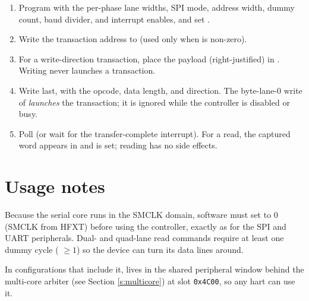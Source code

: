 \begin{enumerate}
	\item Program  with the per-phase lane widths, SPI mode, address width, dummy count, baud divider, and interrupt enables, and set .
	\item Write the transaction address to  (used only when  is non-zero).
	\item For a write-direction transaction, place the payload (right-justified) in . Writing  never launches a transaction.
	\item Write  last, with the opcode, data length, and direction. The byte-lane-0 write of  \emph{launches} the transaction; it is ignored while the controller is disabled or busy.
	\item Poll  (or wait for the transfer-complete interrupt). For a read, the captured word appears in  and  is set; reading  has no side effects.
\end{enumerate}

\section{Usage notes}

Because the serial core runs in the SMCLK domain, software must set  to 0 (SMCLK from HFXT) before using the controller, exactly as for the SPI and UART peripherals. Dual- and quad-lane read commands require at least one dummy cycle ( $\geq 1$) so the device can turn its data lines around.

In configurations that include it,  lives in the shared peripheral window behind the multi-core arbiter (see Section \ref{s:multicore}) at slot \texttt{0x4C00}, so any hart can use it.
